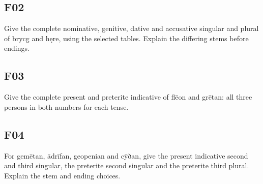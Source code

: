 \subsection*{F02}

\par\begin{minipage}{\linewidth}\raggedright
Give the complete nominative, genitive, dative and accusative singular and plural of brycg and hęre, using the selected tables. Explain the differing stems before endings.

\end{minipage}\par\addvspace{4pt}

\subsection*{F03}

\par\begin{minipage}{\linewidth}\raggedright
Give the complete present and preterite indicative of flēon and grētan: all three persons in both numbers for each tense.

\end{minipage}\par\addvspace{4pt}

\subsection*{F04}

\par\begin{minipage}{\linewidth}\raggedright
For gemētan, ādrīfan, geopenian and cȳðan, give the present indicative second and third singular, the preterite second singular and the preterite third plural. Explain the stem and ending choices.

\end{minipage}\par\addvspace{4pt}

